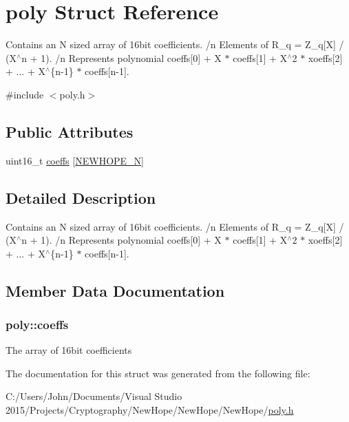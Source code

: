 \hypertarget{structpoly}{}\section{poly Struct Reference}
\label{structpoly}


Contains an N sized array of 16bit coefficients. /n Elements of R\+\_\+q = Z\+\_\+q\mbox{[}X\mbox{]} / (X$^\wedge$n + 1). /n Represents polynomial coeffs\mbox{[}0\mbox{]} + X $\ast$ coeffs\mbox{[}1\mbox{]} + X$^\wedge$2 $\ast$ xoeffs\mbox{[}2\mbox{]} + ... + X$^\wedge$\{n-\/1\} $\ast$ coeffs\mbox{[}n-\/1\mbox{]}.  




{\ttfamily \#include $<$poly.\+h$>$}

\subsection*{Public Attributes}
\begin{DoxyCompactItemize}
\item 
uint16\+\_\+t \hyperlink{structpoly_a5d3f504c4b2e6d93222c65675671eb9a}{coeffs} \mbox{[}\hyperlink{params_8h_a51aac70d00ef1b6b73890aa1d3ac754b}{N\+E\+W\+H\+O\+P\+E\+\_\+\+N}\mbox{]}
\end{DoxyCompactItemize}


\subsection{Detailed Description}
Contains an N sized array of 16bit coefficients. /n Elements of R\+\_\+q = Z\+\_\+q\mbox{[}X\mbox{]} / (X$^\wedge$n + 1). /n Represents polynomial coeffs\mbox{[}0\mbox{]} + X $\ast$ coeffs\mbox{[}1\mbox{]} + X$^\wedge$2 $\ast$ xoeffs\mbox{[}2\mbox{]} + ... + X$^\wedge$\{n-\/1\} $\ast$ coeffs\mbox{[}n-\/1\mbox{]}. 

\subsection{Member Data Documentation}
\hypertarget{structpoly_a5d3f504c4b2e6d93222c65675671eb9a}{}
\subsubsection[{coeffs}]{\setlength{\rightskip}{0pt plus 5cm}poly\+::coeffs}\label{structpoly_a5d3f504c4b2e6d93222c65675671eb9a}
The array of 16bit coefficients 

The documentation for this struct was generated from the following file\+:\begin{DoxyCompactItemize}
\item 
C\+:/\+Users/\+John/\+Documents/\+Visual Studio 2015/\+Projects/\+Cryptography/\+New\+Hope/\+New\+Hope/\+New\+Hope/\hyperlink{poly_8h}{poly.\+h}\end{DoxyCompactItemize}
